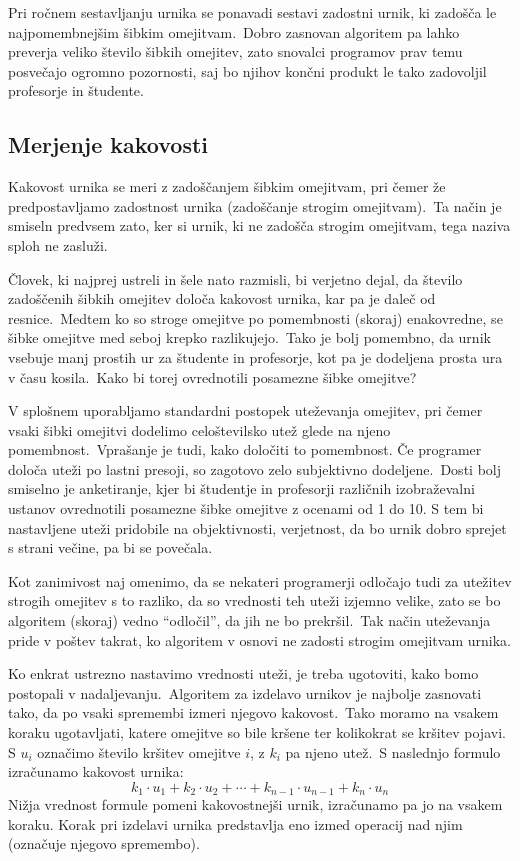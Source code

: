 \documentclass[a4paper,10pt]{article}
\begin{document}
Pri ročnem sestavljanju urnika se ponavadi sestavi zadostni urnik, ki zadošča le
najpomembnejšim šibkim omejitvam.\ Dobro zasnovan algoritem pa lahko preverja veliko
število šibkih omejitev, zato snovalci programov prav temu posvečajo ogromno pozornosti,
saj bo njihov končni produkt le tako zadovoljil profesorje in študente.

\subsection{Merjenje kakovosti}

Kakovost urnika se meri z zadoščanjem šibkim omejitvam, pri čemer že predpostavljamo
zadostnost urnika (zadoščanje strogim omejitvam).\ Ta način je smiseln predvsem zato,
ker si urnik, ki ne zadošča strogim omejitvam, tega naziva sploh ne zasluži.

Človek, ki najprej ustreli in šele nato razmisli, bi verjetno dejal, da število
zadoščenih šibkih omejitev določa kakovost urnika, kar pa je daleč od resnice.\ Medtem
ko so stroge omejitve po pomembnosti (skoraj) enakovredne, se šibke omejitve med seboj
krepko razlikujejo.\ Tako je bolj pomembno, da urnik vsebuje manj prostih ur za
študente in profesorje, kot pa je dodeljena prosta ura v času kosila.\ Kako bi torej
ovrednotili posamezne šibke omejitve?

V splošnem uporabljamo standardni postopek uteževanja omejitev, pri čemer vsaki šibki
omejitvi dodelimo celoštevilsko utež glede na njeno pomembnost.\ Vprašanje je tudi, kako
določiti to pomembnost. Če programer določa uteži po lastni presoji, so zagotovo zelo
subjektivno dodeljene.\ Dosti bolj smiselno je anketiranje, kjer bi študentje in profesorji
različnih izobraževalni ustanov ovrednotili posamezne šibke omejitve z ocenami od 1 do 10.
S tem bi nastavljene uteži pridobile na objektivnosti, verjetnost, da bo urnik dobro
sprejet s strani večine, pa bi se povečala.

Kot zanimivost naj omenimo, da se nekateri programerji odločajo tudi za utežitev strogih
omejitev s to razliko, da so vrednosti teh uteži izjemno velike, zato se bo algoritem
(skoraj) vedno ``odločil'', da jih ne bo prekršil.\ Tak način uteževanja pride v poštev
takrat, ko algoritem v osnovi ne zadosti strogim omejitvam urnika.

Ko enkrat ustrezno nastavimo vrednosti uteži, je treba ugotoviti, kako bomo postopali
v nadaljevanju.\ Algoritem za izdelavo urnikov je najbolje zasnovati tako, da po vsaki
spremembi izmeri njegovo kakovost.\ Tako moramo na vsakem koraku ugotavljati, katere
omejitve so bile kršene ter kolikokrat se kršitev pojavi. 
S $u_i$ označimo število
kršitev omejitve $i$, z $k_i$ pa njeno utež.\ S naslednjo formulo izračunamo
kakovost urnika:
\[
k_1 \cdot u_1 + k_2 \cdot u_2 + \cdots + k_{n-1} \cdot u_{n-1} + k_n \cdot u_n
\]
Nižja vrednost formule pomeni kakovostnejši urnik, izračunamo pa jo na vsakem koraku.
Korak pri izdelavi urnika predstavlja eno izmed operacij nad njim (označuje njegovo
spremembo).
\end{document}
